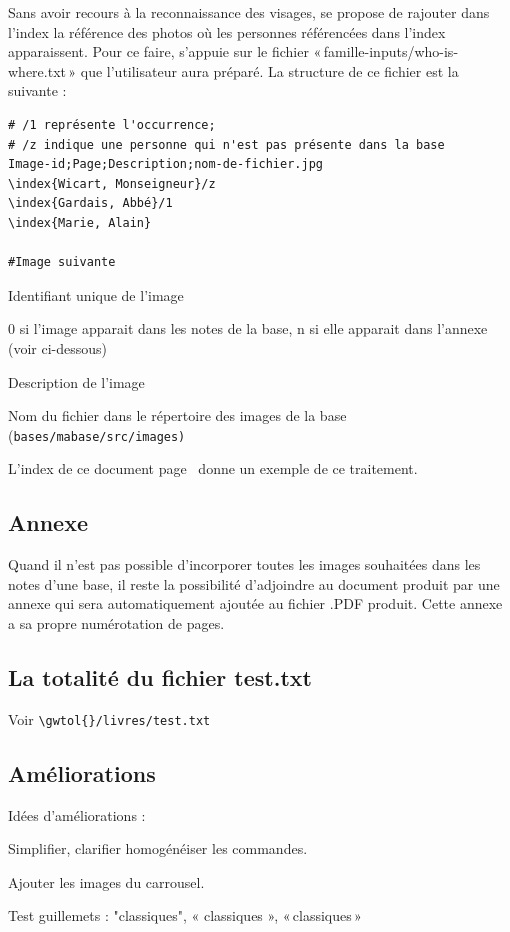 Sans avoir recours à la reconnaissance des visages, \gwtol{} se propose de
rajouter dans l'index la référence des photos où les personnes référencées
dans l'index apparaissent. Pour ce faire, \gwtol{} s'appuie sur le fichier
«\,famille-inputs/who-is-where.txt\,» que l'utilisateur aura préparé.
La structure de ce fichier est la suivante :

\begin{verbatim}
# /1 représente l'occurrence;
# /z indique une personne qui n'est pas présente dans la base
Image-id;Page;Description;nom-de-fichier.jpg
\index{Wicart, Monseigneur}/z
\index{Gardais, Abbé}/1
\index{Marie, Alain}

#Image suivante
\end{verbatim}
\begin{description}[style=nextline]
\item[Image-id] Identifiant unique de l'image
\item[Page] 0 si l'image apparait dans les notes de la base, n si elle apparait
dans l'annexe (voir ci-dessous)
\item[Description] Description de l'image
\item[Nom-de-fichier] Nom du fichier dans le répertoire des images de la base
(\tt{bases/mabase/src/images})
\end{description}

L'index de ce document page~\pageref{index} donne un exemple de ce traitement.

\subsection{Annexe}
\label{annexe}
Quand il n'est pas possible d'incorporer toutes les images souhaitées dans les
notes d'une base, il reste la possibilité d'adjoindre au document produit par
\gwtol{} une annexe qui sera automatiquement ajoutée au fichier .PDF produit.
Cette annexe a sa propre numérotation de pages.

\subsection{La totalité du fichier test.txt}

Voir \verb|\gwtol{}/livres/test.txt|

\subsection{Améliorations}

Idées d'améliorations :
\begin{description}
\item Simplifier, clarifier homogénéiser les commandes.
\item Ajouter les images du carrousel.
\item Test guillemets : "classiques", « classiques », «\,classiques\,»
\end{description}

